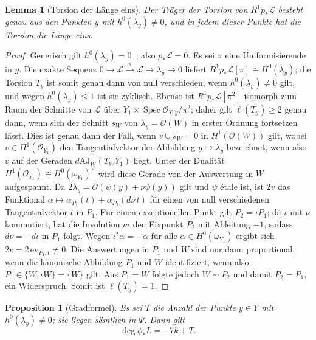\documentclass[11pt]{article}
\newtheorem{proposition}[theorem]{Proposition}
\newtheorem{lemma}[theorem]{Lemma}
\theoremstyle{definition}
\theoremstyle{remark}
\newcommand{\OO}{\mathcal{O}}
\newcommand{\cL}{\mathcal{L}}
\begin{document}
\begin{lemma}[Torsion der Länge eins]\label{lem:length}
Der Träger der Torsion von $R^1p_*\cL$ besteht genau aus den Punkten $y$ mit
$h^0(\lambda_y)\ne 0$, und in jedem dieser Punkte hat die Torsion die Länge eins.
\end{lemma}

\begin{proof}
Generisch gilt $h^0(\lambda_y)=0$~\cite[Prop.~5\,ii)]{So26}, also $p_*\cL=0$.
Es sei $\pi$ eine Uniformisierende in $y$. Die exakte Sequenz
$0\to\cL\xrightarrow{\pi}\cL\to\lambda_y\to 0$ liefert
$R^1p_*\cL[\pi]\cong H^0(\lambda_y)$; die Torsion $T_y$ ist somit genau dann von
null verschieden, wenn $h^0(\lambda_y)\ne 0$ gilt, und wegen
$h^0(\lambda_y)\le 1$ ist sie zyklisch. Ebenso ist $R^1p_*\cL[\pi^2]$ isomorph
zum Raum der Schnitte von $\cL$ über $Y_1\times\operatorname{Spec}\OO_{Y,y}/\pi^2$;
daher gilt $\ell(T_y)\ge 2$ genau dann, wenn sich der Schnitt $s_W$ von
$\lambda_y=\OO(W)$ in erster Ordnung fortsetzen lässt. Dies ist genau dann der
Fall, wenn $v\cup s_W=0$ in $H^1(\OO(W))$ gilt, wobei $v\in H^1(\OO_{Y_1})$ den
Tangentialvektor der Abbildung $y\mapsto\lambda_y$ bezeichnet, wenn also $v$ auf
der Geraden $d\mathrm{AJ}_W(T_WY_1)$ liegt. Unter der Dualität $H^1(\OO_{Y_1})\cong
H^0(\omega_{Y_1})^\vee$ wird diese Gerade von der Auswertung in $W$ aufgespannt.
Da $2\lambda_y=\OO(\psi(y)+\nu\psi(y))$ gilt und $\psi$ étale ist, ist $2v$ das
Funktional $\alpha\mapsto\alpha_{P_1}(t)+\alpha_{P_2}(d\nu\,t)$ für einen von
null verschiedenen Tangentialvektor $t$ in $P_1$. Für einen exzeptionellen Punkt
gilt $P_2=\iota P_1$; da $\iota$ mit $\nu$ kommutiert, hat die Involution
$\nu\iota$ den Fixpunkt $P_2$ mit Ableitung $-1$, sodass $d\nu=-d\iota$ in $P_1$
folgt. Wegen $\iota^*\alpha=-\alpha$ für alle $\alpha\in H^0(\omega_{Y_1})$
ergibt sich $2v=2\,\mathrm{ev}_{P_1,t}\ne 0$. Die Auswertungen in $P_1$ und $W$
sind nur dann proportional, wenn die kanonische Abbildung $P_1$ und $W$
identifiziert, wenn also $P_1\in\{W,\iota W\}=\{W\}$ gilt. Aus $P_1=W$ folgte
jedoch $W\sim P_2$ und damit $P_2=P_1$, ein Widerspruch. Somit ist $\ell(T_y)=1$.
\end{proof}

\begin{proposition}[Gradformel]\label{prop:degree}
Es sei $T$ die Anzahl der Punkte $y\in Y$ mit $h^0(\lambda_y)\ne 0$; sie liegen
sämtlich in $\Psi$. Dann gilt
\[
\deg\phi_*L=-7k+T .
\]
\end{proposition}
\end{document}
